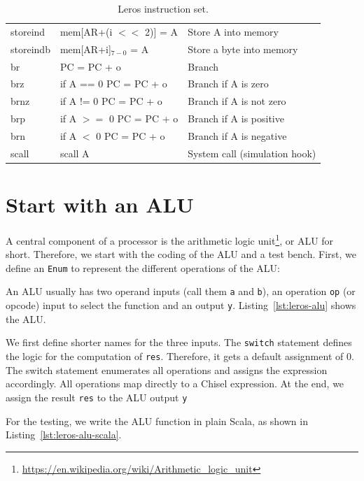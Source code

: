 \documentclass[%
    10pt,
    headinclude, footexclude,
    openright, %
    notitlepage,
    cleardoubleempty,
    headsepline,
    pointlessnumbers,
    bibtotoc, idxtotoc,
    ]{scrbook}
\newcommand{\code}[1]{{\small{\texttt{#1}}}}
\newcommand{\todo}[1]{{\emph{TODO: #1}}}
\newcommand{\myref}[2]{\href{#1}{#2}}
\renewcommand{\myref}[2]{{#2}{\footnote{\url{#1}}}}
\renewcommand{\todo}[1]{}
\begin{document}
\begin{table}
\begin{tabular}{lll}
storeind & mem[AR+(i $<<$ 2)] = A & Store A into memory \\
storeindb & mem[AR+i]$_{7-0}$ = A & Store a byte into memory \\
br & PC = PC + o & Branch \\
brz & if A == 0 PC = PC + o & Branch if A is zero \\
brnz & if A != 0 PC = PC + o  & Branch if A is not zero \\
brp & if A $>=$ 0 PC = PC + o & Branch if A is positive \\
brn & if A $<$ 0 PC = PC + o & Branch if A is negative \\
scall & scall A & System call (simulation hook) \\
\bottomrule
\end{tabular}
\caption{Leros instruction set.}
\label{tab:leros:isa}
\end{table}

\section{Start with an ALU}

A central component of a processor is the
\myref{https://en.wikipedia.org/wiki/Arithmetic_logic_unit}{arithmetic logic unit}, or ALU for short.
Therefore, we start with the coding of the ALU and a test bench.
First, we define an \code{Enum} to represent the different operations of the ALU:


\noindent An ALU usually has two operand inputs (call them \code{a} and \code{b}), an operation \code{op}
(or opcode) input to select the function and an output \code{y}.
Listing~\ref{lst:leros-alu} shows the ALU.

\todo{draw a nice ALU, see Wikipedia}

We first define shorter names for the three inputs. The \code{switch} statement defines the
logic for the computation of \code{res}. Therefore, it gets a default assignment of 0.
The switch statement enumerates all operations and assigns the expression accordingly.
All operations map directly to a Chisel expression.
At the end, we assign the result \code{res} to the ALU output \code{y}


For the testing, we write the ALU function in plain Scala, as shown in Listing~\ref{lst:leros-alu-scala}.
\end{document}
